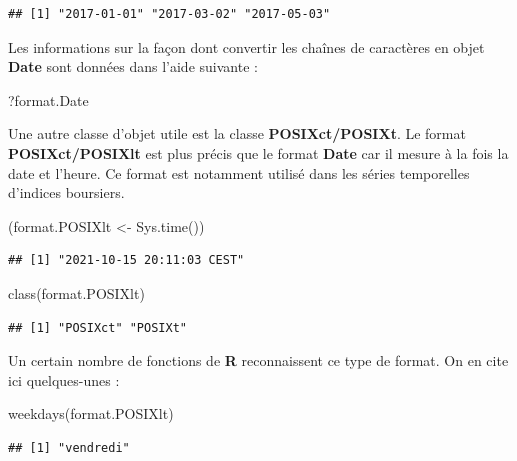 \documentclass[
]{book}
\newenvironment{Shaded}{\begin{snugshade}}{\end{snugshade}}
\newcommand{\FunctionTok}[1]{\textcolor[rgb]{0.00,0.00,0.00}{#1}}
\newcommand{\NormalTok}[1]{#1}
\newcommand{\OtherTok}[1]{\textcolor[rgb]{0.56,0.35,0.01}{#1}}
\theoremstyle{definition}
\theoremstyle{definition}
\theoremstyle{definition}
\theoremstyle{definition}
\theoremstyle{remark}
\begin{document}
\begin{verbatim}
## [1] "2017-01-01" "2017-03-02" "2017-05-03"
\end{verbatim}

Les informations sur la façon dont convertir les chaînes de caractères en objet \textbf{Date} sont données dans l'aide suivante :

\begin{Shaded}
\begin{Highlighting}[]
\NormalTok{?format.Date}
\end{Highlighting}
\end{Shaded}

Une autre classe d'objet utile est la classe \textbf{POSIXct/POSIXt}. Le format \textbf{POSIXct/POSIXlt} est plus précis que le format \textbf{Date} car il mesure à la fois la date et l'heure. Ce format est notamment utilisé dans les séries temporelles d'indices boursiers.

\begin{Shaded}
\begin{Highlighting}[]
\NormalTok{(format.POSIXlt }\OtherTok{\textless{}{-}} \FunctionTok{Sys.time}\NormalTok{())}
\end{Highlighting}
\end{Shaded}

\begin{verbatim}
## [1] "2021-10-15 20:11:03 CEST"
\end{verbatim}

\begin{Shaded}
\begin{Highlighting}[]
\FunctionTok{class}\NormalTok{(format.POSIXlt)}
\end{Highlighting}
\end{Shaded}

\begin{verbatim}
## [1] "POSIXct" "POSIXt"
\end{verbatim}

Un certain nombre de fonctions de \textbf{R} reconnaissent ce type de format. On en cite ici quelques-unes :

\begin{Shaded}
\begin{Highlighting}[]
\FunctionTok{weekdays}\NormalTok{(format.POSIXlt)}
\end{Highlighting}
\end{Shaded}

\begin{verbatim}
## [1] "vendredi"
\end{verbatim}
\end{document}

